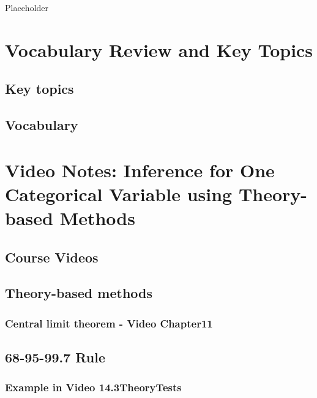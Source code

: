 \documentclass[
]{report}
\begin{document}
Placeholder

\section{Vocabulary Review and Key Topics}\label{vocabulary-review-and-key-topics-3}

\subsection{Key topics}\label{key-topics-3}

\subsection{Vocabulary}\label{vocabulary-3}

\section{Video Notes: Inference for One Categorical Variable using Theory-based Methods}\label{video-notes-inference-for-one-categorical-variable-using-theory-based-methods}

\subsection{Course Videos}\label{course-videos-3}

\subsection*{Theory-based methods}\label{theory-based-methods}

\subsubsection*{Central limit theorem - Video Chapter11}\label{central-limit-theorem---video-chapter11}

\subsection*{68-95-99.7 Rule}\label{rule}

\subsubsection*{Example in Video 14.3TheoryTests}\label{example-in-video-14.3theorytests}
\end{document}
